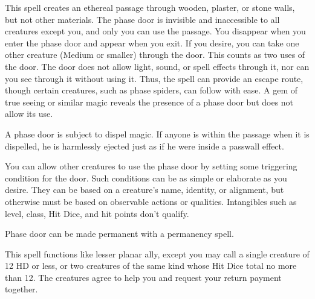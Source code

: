 \begin{multicols}{2}
\begin{small}
\noindent This spell creates an ethereal passage through wooden, plaster, or stone walls, but not other materials. The phase door is invisible and inaccessible to all creatures except you, and only you can use the passage. You disappear when you enter the phase door and appear when you exit. If you desire, you can take one other creature (Medium or smaller) through the door. This counts as two uses of the door. The door does not allow light, sound, or spell effects through it, nor can you see through it without using it. Thus, the spell can provide an escape route, though certain creatures, such as phase spiders, can follow with ease. A gem of true seeing or similar magic reveals the presence of a phase door but does not allow its use.

\smallskip\noindent A phase door is subject to dispel magic. If anyone is within the passage when it is dispelled, he is harmlessly ejected just as if he were inside a passwall effect.

\smallskip\noindent You can allow other creatures to use the phase door by setting some triggering condition for the door. Such conditions can be as simple or elaborate as you desire. They can be based on a creature's name, identity, or alignment, but otherwise must be based on observable actions or qualities. Intangibles such as level, class, Hit Dice, and hit points don't qualify.

\smallskip\noindent Phase door can be made permanent with a permanency spell.

\noindent This spell functions like lesser planar ally, except you may call a single creature of 12 HD or less, or two creatures of the same kind whose Hit Dice total no more than 12. The creatures agree to help you and request your return payment together.



\end{small}
\end{multicols}
